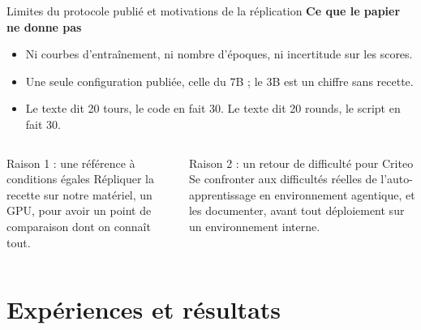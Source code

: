 \documentclass[aspectratio=169,10pt]{beamer}
\begin{document}
\begin{frame}{Limites du protocole publié et motivations de la réplication}
\textbf{Ce que le papier ne donne pas}
\begin{itemize}
  \item Ni courbes d'entraînement, ni nombre d'époques, ni incertitude sur les scores.
  \item Une seule configuration publiée, celle du 7B ; le 3B est un chiffre sans recette.
  \item Le texte dit 20 tours, le code en fait 30. Le texte dit 20 rounds, le script en fait 30.
\end{itemize}
\vspace{0.3cm}
\begin{columns}[T]
\begin{block}{Raison 1 : une référence à conditions égales}
Répliquer la recette sur notre matériel, un GPU, pour avoir un point de comparaison dont on connaît tout.
\end{block}
\begin{block}{Raison 2 : un retour de difficulté pour Criteo}
Se confronter aux difficultés réelles de l'auto-apprentissage en environnement agentique, et les documenter, avant tout déploiement sur un environnement interne.
\end{block}
\end{columns}
\end{frame}

\section{Expériences et résultats}
\end{document}
